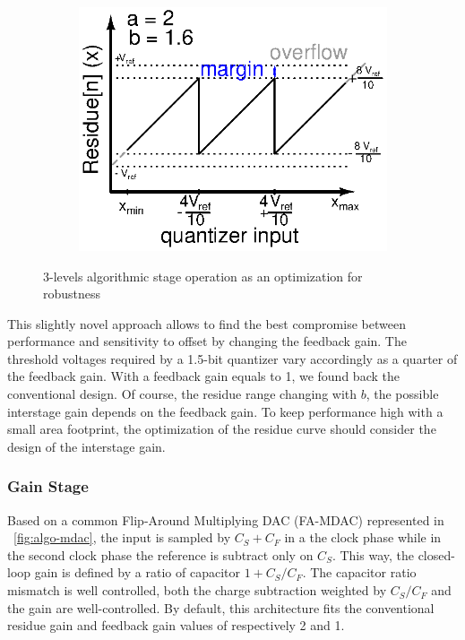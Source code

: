 \begin{figure}[htp]
\begin{subfigure}[b]{0.32\textwidth}
		\label{fig:algo-21}
	\end{subfigure}
	\begin{subfigure}[b]{0.32\textwidth}
		\centering
		\includegraphics[width=\textwidth]{Chapter4/Figs/3-levels-pattern-algo-2-1_6.ps}
		\label{fig:algo-21-6}
	\end{subfigure}
	\caption{3-levels algorithmic stage operation as an optimization for robustness}
	\label{fig:algo-quantizer}
\end{figure}

This slightly novel approach allows to find the best compromise between performance and sensitivity to offset by changing the feedback gain. The threshold voltages required by a 1.5-bit quantizer vary accordingly as a quarter of the feedback gain. With a feedback gain equals to 1, we found back the conventional design. Of course, the residue range changing with $b$, the possible interstage gain depends on the feedback gain. To keep performance high with a small area footprint, the optimization of the residue curve should consider the design of the interstage gain.

	\subsubsection{Gain Stage}              %
	\label{sec:algo_gain_stage}
Based on a common Flip-Around Multiplying DAC (FA-MDAC) represented in \figurename~\ref{fig:algo-mdac}, the input is sampled by \(C_S+C_F\) in a the clock phase while in the second clock phase the reference is subtract only on \(C_S\). This way, the closed-loop gain is defined by a ratio of capacitor \(1+C_S/C_F\). The capacitor ratio mismatch is well controlled, both the charge subtraction weighted by \(C_S/C_F\) and the gain are well-controlled. By default, this architecture fits the conventional residue gain and feedback gain values of respectively 2 and 1.

